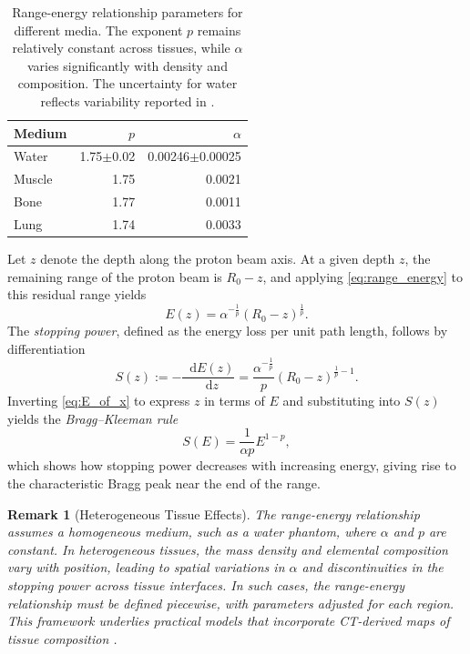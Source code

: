 \documentclass{amsart}
\theoremstyle{plain}
\newtheorem{remark}[theorem]{Remark}
\renewcommand{\d}{\mathop{}\!\mathrm{d}}
\begin{document}
\begin{table}[h!]
  \centering
  \begin{tabular}{lrr}
    \toprule
    Medium & \( p \) & \( \alpha \) \\
    \midrule
    Water & 1.75$\pm$0.02 & 0.00246$\pm$0.00025 \\
    Muscle & 1.75 & 0.0021 \\
    Bone & 1.77 & 0.0011 \\
    Lung & 1.74 & 0.0033 \\
    \bottomrule
  \end{tabular}
  \caption{
    \label{tab:range_energy}
    Range-energy relationship parameters for different media. The
    exponent $p$ remains relatively constant across tissues, while
    $\alpha$ varies significantly with density and composition. The
    uncertainty for water reflects variability reported in
    \cite{pettersen2018accuracy, boon1998dosimetry,
      bortfeld1997analytical}.}
\end{table}

Let $z$ denote the depth along the proton beam axis. At a given depth
$z$, the remaining range of the proton beam is $R_0 - z$, and applying
\eqref{eq:range_energy} to this residual range yields
\begin{equation}
  E(z) = \alpha^{-\frac{1}{p}} \left( R_0 - z \right)^{\frac{1}{p}}.
  \label{eq:E_of_x}
\end{equation}
The \emph{stopping power}, defined as the energy loss per unit path
length, follows by differentiation
\begin{equation}
  S(z) := -\frac{\d E(z)}{\d z}
  =
  \frac{\alpha^{-\frac{1}{p}}}{p} \left( R_0 - z \right)^{\frac{1}{p} - 1}.
\end{equation}
Inverting \eqref{eq:E_of_x} to express $z$ in terms of $E$ and
substituting into $S(z)$ yields the \emph{Bragg--Kleeman rule}
\begin{equation}
  S(E) = \frac{1}{\alpha p} E^{1-p},
  \label{eq:BraggKleeman}
\end{equation}
which shows how stopping power decreases with increasing energy,
giving rise to the characteristic Bragg peak near the end of the
range.

\begin{remark}[Heterogeneous Tissue Effects]
  The range-energy relationship assumes a homogeneous medium, such as
  a water phantom, where $\alpha$ and $p$ are constant. In
  heterogeneous tissues, the mass density and elemental composition
  vary with position, leading to spatial variations in $\alpha$ and
  discontinuities in the stopping power across tissue interfaces. In
  such cases, the range-energy relationship must be defined piecewise,
  with parameters adjusted for each region. This framework underlies
  practical models that incorporate CT-derived maps of tissue
  composition \cite{cox2024bayesian}.
\end{remark}
\end{document}
